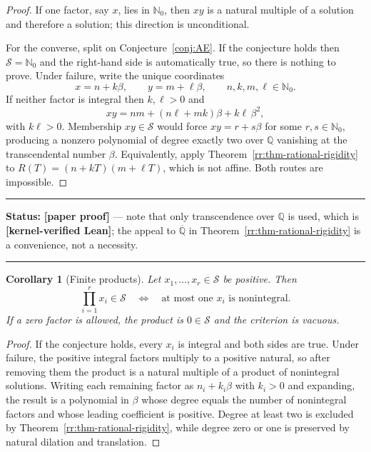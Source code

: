 \documentclass[11pt,oneside]{article}
\newtheorem{corollary}[theorem]{Corollary}
\theoremstyle{definition}
\theoremstyle{remark}
\newcommand{\Nzero}{\mathbb N_0}
\newcommand{\Q}{\mathbb Q}
\newcommand{\Abar}{\overline{\mathbb Q}}
\newcommand{\Sol}{\mathcal S}
\newcommand{\statuslean}{\textcolor{leanblue}{\textbf{[kernel-verified Lean]}}}
\newcommand{\statusnew}{\textcolor{newgreen}{\textbf{[paper proof]}}}
\newenvironment{statusbox}[1]
{\begin{center}\begin{minipage}{0.94\textwidth}\raggedright\hbadness=10000\hrule
\vspace{0.45em}\textbf{Status:} #1\par\vspace{0.35em}}
{\vspace{0.35em}\hrule\end{minipage}\end{center}}
\begin{document}
\begin{proof}
If one factor, say $x$, lies in $\Nzero$, then $xy$ is a natural multiple of a solution and
therefore a solution; this direction is unconditional.

For the converse, split on Conjecture~\ref{conj:AE}.  If the conjecture holds then
$\Sol=\Nzero$ and the right-hand side is automatically true, so there is nothing to prove.
Under failure, write the unique coordinates
\[
 x=n+k\beta,
 \qquad
 y=m+\ell\beta ,
 \qquad n,k,m,\ell\in\Nzero .
\]
If neither factor is integral then $k,\ell>0$ and
\[
 xy=nm+(n\ell+mk)\beta+k\ell\,\beta^2 ,
\]
with $k\ell>0$.  Membership $xy\in\Sol$ would force $xy=r+s\beta$ for some $r,s\in\Nzero$,
producing a nonzero polynomial of degree exactly two over $\Q$ vanishing at the
transcendental number $\beta$.  Equivalently, apply Theorem~\ref{rr:thm-rational-rigidity} to
$R(T)=(n+kT)(m+\ell T)$, which is not affine.  Both routes are impossible.
\end{proof}

\begin{statusbox}{\statusnew{} --- note that only transcendence over $\Q$ is used, which is
\statuslean{}; the appeal to $\Abar$ in Theorem~\ref{rr:thm-rational-rigidity} is a
convenience, not a necessity.}
\end{statusbox}

\begin{corollary}[Finite products]
\label{rr:cor-finite-products}
Let $x_1,\ldots,x_r\in\Sol$ be positive.  Then
\[
 \prod_{i=1}^r x_i\in\Sol
 \quad\Longleftrightarrow\quad
 \text{at most one }x_i\text{ is nonintegral} .
\]
If a zero factor is allowed, the product is $0\in\Sol$ and the criterion is vacuous.
\end{corollary}

\begin{proof}
If the conjecture holds, every $x_i$ is integral and both sides are true.  Under failure,
the positive integral factors multiply to a positive natural, so after removing them the
product is a natural multiple of a product of nonintegral solutions.  Writing each remaining
factor as $n_i+k_i\beta$ with $k_i>0$ and expanding, the result is a polynomial in $\beta$
whose degree equals the number of nonintegral factors and whose leading coefficient is
positive.  Degree at least two is excluded by Theorem~\ref{rr:thm-rational-rigidity}, while
degree zero or one is preserved by natural dilation and translation.
\end{proof}
\end{document}
